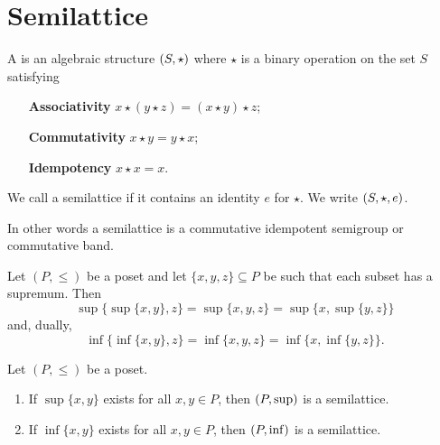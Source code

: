 \section{Semilattice}
\begin{definition}
A  is an algebraic structure $\left( S,\star \right)$ where $\star$ is a binary operation on the set $S$ satisfying
\begin{itemize}[leftmargin=2.5cm]
\item[\textbf{Associativity}] $x\star (y\star z) = (x\star y) \star z$;
\item[\textbf{Commutativity}] $x \star y = y \star x$;
\item[\textbf{Idempotency}] $x\star x = x$.
\end{itemize}
We call a semilattice  if it contains an identity $e$ for $\star$. We write $\left( S, \star, e \right)$.
\end{definition}
In other words a semilattice is a commutative idempotent semigroup or commutative band.

\begin{lemma}
Let $(P,\leq)$ be a poset and let $\{x,y,z\}\subseteq P$ be such that each subset has a supremum. Then
\[ \sup\{\sup\{x,y\},z\} = \sup\{x,y,z\} = \sup\{x,\sup\{y,z\}\} \]
and, dually,
\[ \inf\{\inf\{x,y\},z\} = \inf\{x,y,z\} = \inf\{x,\inf\{y,z\}\}. \]
\end{lemma}
\begin{corollary}
Let $(P,\leq)$ be a poset.
\begin{enumerate}
\item If $\sup\{x,y\}$ exists for all $x,y\in P$, then $\left( P,\sup \right)$ is a semilattice.
\item If $\inf\{x,y\}$ exists for all $x,y\in P$, then $\left( P,\inf \right)$ is a semilattice.
\end{enumerate}
\end{corollary}

